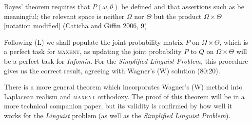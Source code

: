 \documentclass[11pt]{article}
\begin{document}

\begin{quotex}
  Bayes' theorem requires that $P(\omega,\theta)$ be defined and that
  assertions such as  be
  meaningful; the relevant space is neither $\Omega$ nor $\Theta$ but
  the product $\Omega\times\Theta$ [notation modified]
  (Caticha and Giffin 2006, 9)
\end{quotex}

Following (L) we shall populate the joint probability matrix $P$ on
$\Omega\times\Theta$, which is a perfect task for \textsc{maxent}, as
updating the joint probability $P$ to $Q$ on $\Omega\times\Theta$ will
be a perfect task for \emph{Infomin}. For the \emph{Simplified
  Linguist Problem,} this procedure gives us the correct result,
agreeing with Wagner's (W) solution (80:20). 

There is a more general theorem which incorporates Wagner's (W) method
into Laplacean realism and \textsc{maxent} orthodoxy. The proof of
this theorem will be in a more technical companion paper, but its
validity is confirmed by how well it works for the \emph{Linguist}
problem (as well as the \emph{Simplified Linguist Problem}).
\end{document}

